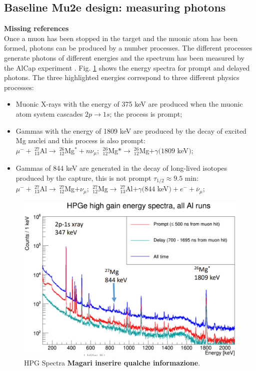 \documentclass[12pt,a4paper,openright, oneside, titlepage]{book} %
\begin{document}
\subsection{Baseline Mu2e design: measuring photons}
\textbf{Missing references}\\
Once a muon has been stopped in the target 
and the muonic atom has been formed, 
photons can be produced by a number processes. 
The different processes generate photons of different energies 
and the spectrum has been measured by the AlCap experiment \cite{AlCap:2015}\cite{AlCap:2020}.
Fig. \ref{_HPG_Spectra} shows the energy spectra for prompt and delayed photons.
The three highlighted energies correspond to three different physics processes:
\begin{itemize}
\item Muonic X-rays with the energy of 375 keV are produced when the muonic atom system cascades $2p\rightarrow 1s$; 
the process is prompt;
\item Gammas with the energy of 1809 keV are produced by the decay of excited Mg nuclei and this process is also prompt:\\
$\mu^-+\ _{13}^{27}$Al$\rightarrow \ _{12}^{26}$Mg$^*+n\nu_\mu$; $\ _{12}^{26}$Mg$*\rightarrow \ _{12}^{26}$Mg$+\gamma(1809$ keV$)$;
\item Gammas of 844 keV are generated in the decay of long-lived isotopes produced by the capture, this is not prompt $\tau_{1/2}\approx9.5$ min:\\
$\mu^-+\ _{13}^{27}$Al$\rightarrow \ _{12}^{27}$Mg$+\nu_\mu$; $\ _{12}^{27}$Mg$\rightarrow \ _{13}^{27}$Al$+\gamma(844$ keV$)+e^-+\overline{\nu}_\mu$;\\
\end{itemize}

\begin{figure}[h!]
\centering
\includegraphics[scale=0.6]{HPG_Spectra}
\caption{HPG Spectra {\bf{Magari inserire qualche informazione}}.}
\label{_HPG_Spectra}
\end{figure}
\end{document}
